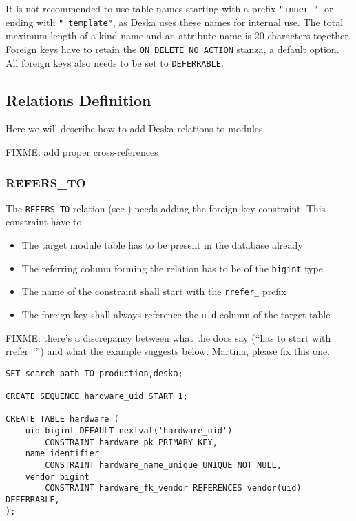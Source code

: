 \documentclass[deska]{subfiles}
\begin{document}
It is not recommended to use table names starting with a prefix {\tt "inner\_"}, or ending with {\tt "\_template"}, as
Deska uses these names for internal use.  The total maximum length of a kind name and an attribute name is 20 characters
together.  Foreign keys have to retain the {\tt ON DELETE NO ACTION} stanza, a default option. All foreign keys also
needs to be set to {\tt DEFERRABLE}.

\subsection{Relations Definition}
Here we will describe how to add Deska relations to modules.

FIXME: add proper cross-references

\subsubsection{REFERS\_TO}
\label{sec:db-scheme-refers-to}

The {\tt REFERS\_TO} relation (see ) needs adding the foreign key constraint. This
constraint have to:

\begin{itemize}
    \item The target module table has to be present in the database already
    \item The referring column forming the relation has to be of the {\tt bigint} type
    \item The name of the constraint shall start with the {\tt rrefer\_} prefix
    \item The foreign key shall always reference the {\tt uid} column of the target table
\end{itemize}

FIXME: there's a discrepancy between what the docs say (``has to start with rrefer\_'') and what the example suggests
below. Martina, please fix this one.

\begin{verbatim}
SET search_path TO production,deska;

CREATE SEQUENCE hardware_uid START 1;

CREATE TABLE hardware (
    uid bigint DEFAULT nextval('hardware_uid')
        CONSTRAINT hardware_pk PRIMARY KEY,
    name identifier
        CONSTRAINT hardware_name_unique UNIQUE NOT NULL,
    vendor bigint 
        CONSTRAINT hardware_fk_vendor REFERENCES vendor(uid) DEFERRABLE,
);
\end{verbatim}
\end{document}
